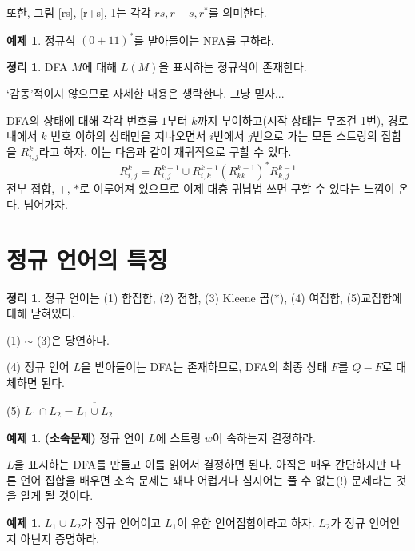 \documentclass[b5paper, 10pt]{book}
\theoremstyle{definition}
\newtheorem{thm}[defn]{정리}
\newtheorem{ex}[defn]{예제}
\newenvironment{pf*}{\pushQED{\qed}\pf}{\popQED\endpf}
\begin{document}
\begin{figure}[!ht]
    \centering
    \caption{} 
    \label{r*}
\end{figure}
또한, 그림 \ref{rs}, \ref{r+s}, \ref{r*}는 각각 $rs, r+s, r^*$를 의미한다. 
\begin{ex}
     정규식 $(0+11)^*$를 받아들이는 NFA를 구하라. 
\end{ex}
\begin{thm}
    DFA $M$에 대해 $L(M)$을 표시하는 정규식이 존재한다.
\end{thm}
\begin{pf*}
    `감동'적이지 않으므로 자세한 내용은 생략한다. 그냥 믿자...

DFA의 상태에 대해 각각 번호를 $1$부터 $k$까지 부여하고(시작 상태는 무조건 1번), 경로 내에서
$k$ 번호 이하의 상태만을 지나오면서 $i$번에서 $j$번으로 
가는 모든 스트링의 집합을 $R^{k}_{i,j}$라고 하자.
이는 다음과 같이 재귀적으로 구할 수 있다.
$$R^{k}_{i,j} = R^{k-1}_{i,j} \cup R^{k-1}_{i,k}\left(R^{k-1}_{kk}\right)^{*} R^{k-1}_{k,j}$$
전부 접합, $+$, $*$로 이루어져 있으므로 이제 대충 귀납법 쓰면 구할 수 있다는 느낌이 온다. 넘어가자.
\end{pf*}
\section{정규 언어의 특징}
\begin{thm} \label{RE feature}
    정규 언어는 (1) 합집합, (2) 접합, (3) Kleene 곱($*$), (4) 여집합, (5)교집합에
대해 닫혀있다.
\end{thm}
\begin{pf*}
    (1) $\sim$ (3)은 당연하다.

(4) 정규 언어 $L$을 받아들이는 DFA는 존재하므로, DFA의 최종 상태 $F$를
$Q-F$로 대체하면 된다.

(5) $L_1 \cap L_2  = \overline{\overline{L_1} \cup \overline{L_2}}$
\end{pf*} 
\begin{ex}
    \textbf{(소속문제)} 정규 언어 $L$에 스트링 $w$이 속하는지 결정하라. 

$L$을 표시하는 DFA를 만들고 이를 읽어서 결정하면 된다. 아직은 매우 간단하지만 
다른 언어 집합을 배우면 소속 문제는 꽤나 어렵거나 심지어는 풀 수 없는(!) 
문제라는 것을 알게 될 것이다. 
\end{ex} 
\begin{ex}
    $L_1 \cup L_2$가 정규 언어이고 $L_1$이 유한 언어집합이라고 하자. $L_2$가
    정규 언어인지 아닌지 증명하라. 
\end{ex}
\end{document}
